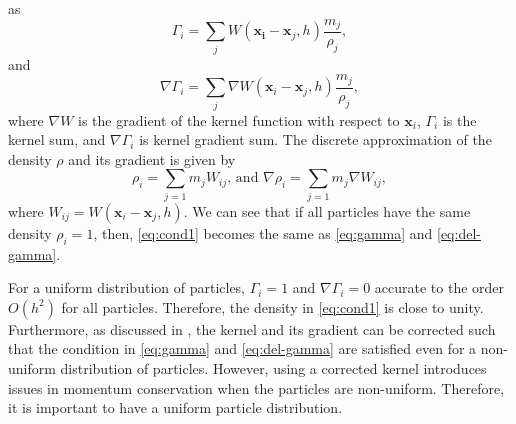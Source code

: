 \documentclass[preprint,12pt]{elsarticle}
\newcommand{\ten}[1]{\ensuremath{\mathbf{#1}}}
\begin{document}
as
\begin{equation}
  \Gamma_i = \sum_{j}  W(\ten{x_i} - \ten{x}_j, h) \frac{m_j}{\rho_j},
  \label{eq:gamma}
\end{equation}
and
\begin{equation}
  \nabla \Gamma_i = \sum_{j}  \nabla W(\ten{x}_i - \ten{x}_j, h) \frac{m_j}{\rho_j},
  \label{eq:del-gamma}
\end{equation}
where $\nabla W$ is
the gradient of the kernel function with respect to $\ten{x}_i$, $\Gamma_i$
is the kernel sum, and $\nabla \Gamma_i$ is kernel gradient sum. The discrete
approximation of the density $\rho$ and its gradient is given by
\begin{equation}
  \rho_i = \sum_{j=1} m_j W_{ij}
  \text{, and }
  \nabla \rho_i = \sum_{j=1} m_j \nabla W_{ij},
  \label{eq:cond1}
\end{equation}
where $W_{ij} = W(\ten{x}_i-\ten{x}_j, h)$. We can see that if all particles
have the same density $\rho_i = 1$, then, \cref{eq:cond1} becomes the same as
\cref{eq:gamma} and \cref{eq:del-gamma}.

For a uniform distribution of particles, $\Gamma_i=1$ and $\nabla \Gamma_i=0$
accurate to the order $O(h^2)$ for all particles. Therefore, the density in
\cref{eq:cond1} is close to unity. Furthermore, as discussed in
\citet{kiara_sph_2013}, the kernel and its gradient can be corrected such
that the condition in \cref{eq:gamma} and \cref{eq:del-gamma} are satisfied
even for a non-uniform distribution of particles. However, using a corrected
kernel introduces issues in momentum conservation when the particles are
non-uniform. Therefore, it is important to have a uniform particle
distribution.
\end{document}
